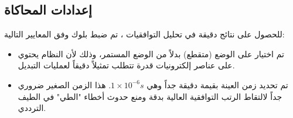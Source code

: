 

\subsection{إعدادات المحاكاة }

للحصول على نتائج دقيقة في تحليل التوافقيات ، تم ضبط بلوك  وفق المعايير التالية:
\begin{itemize}
    \item تم اختيار \textbf{} على الوضع  (متقطع) بدلاً من الوضع المستمر، وذلك لأن النظام يحتوي على عناصر إلكترونيات قدرة  تتطلب تمثيلاً دقيقاً لعمليات التبديل.
    \item تم تحديد زمن العينة  \textbf{} بقيمة دقيقة جداً وهي $1 \times 10^{-6} s$. هذا الزمن الصغير ضروري جداً لالتقاط الرتب التوافقية العالية بدقة ومنع حدوث أخطاء "الطي"  في الطيف الترددي.
\end{itemize}

